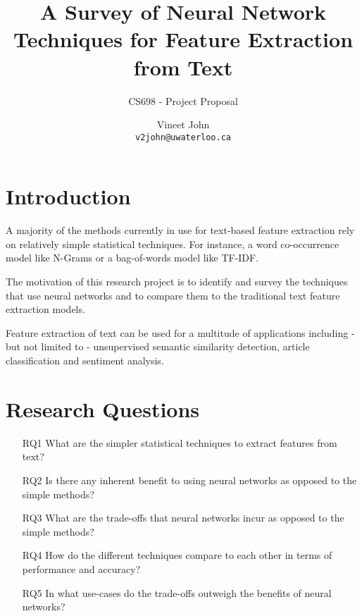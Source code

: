 \documentclass[parskip=half]{scrartcl}
\begin{document}
\title{
    A Survey of Neural Network Techniques for Feature Extraction from Text
}
\subtitle{CS698 - Project Proposal}
\author{
    Vineet John\\
    \texttt{v2john@uwaterloo.ca}
}
\date{}
\maketitle

\section{Introduction} %
\label{sec:introduction}

    A majority of the methods currently in use for text-based feature extraction rely on relatively simple statistical techniques. For instance, a word co-occurrence model like N-Grams or a bag-of-words model like TF-IDF.

    The motivation of this research project is to identify and survey the techniques that use neural networks and to compare them to the traditional text feature extraction models.

    Feature extraction of text can be used for a multitude of applications including - but not limited to - unsupervised semantic similarity detection, article classification and sentiment analysis.


\section{Research Questions} %
\label{sec:research_questions}

    \begin{itemize}
        \item [RQ1] What are the simpler statistical techniques to extract features from text?
        \item [RQ2] Is there any inherent benefit to using neural networks as opposed to the simple methods?
        \item [RQ3] What are the trade-offs that neural networks incur as opposed to the simple methods?
        \item [RQ4] How do the different techniques compare to each other in terms of performance and accuracy?
        \item [RQ5] In what use-cases do the trade-offs outweigh the benefits of neural networks?
    \end{itemize}
\end{document}
